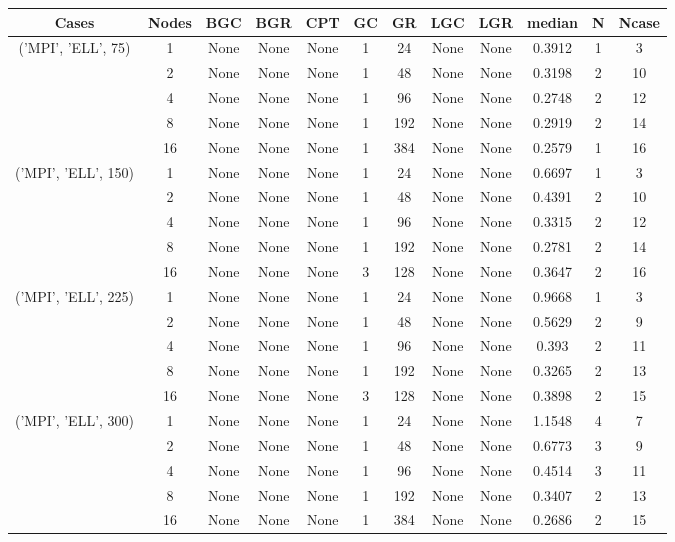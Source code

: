 \begin{tabular}{cccccccccccc}
\hline
Cases & Nodes& BGC& BGR& CPT& GC& GR& LGC& LGR& median & N & Ncase \\
\hline
\multirow{5}{*}{('MPI', 'ELL', 75)}& 1& None& None& None& 1& 24& None& None& 0.3912& 1& 3\\
& 2& None& None& None& 1& 48& None& None& 0.3198& 2& 10\\
& 4& None& None& None& 1& 96& None& None& 0.2748& 2& 12\\
& 8& None& None& None& 1& 192& None& None& 0.2919& 2& 14\\
& 16& None& None& None& 1& 384& None& None& 0.2579& 1& 16\\
\hline
\multirow{5}{*}{('MPI', 'ELL', 150)}& 1& None& None& None& 1& 24& None& None& 0.6697& 1& 3\\
& 2& None& None& None& 1& 48& None& None& 0.4391& 2& 10\\
& 4& None& None& None& 1& 96& None& None& 0.3315& 2& 12\\
& 8& None& None& None& 1& 192& None& None& 0.2781& 2& 14\\
& 16& None& None& None& 3& 128& None& None& 0.3647& 2& 16\\
\hline
\multirow{5}{*}{('MPI', 'ELL', 225)}& 1& None& None& None& 1& 24& None& None& 0.9668& 1& 3\\
& 2& None& None& None& 1& 48& None& None& 0.5629& 2& 9\\
& 4& None& None& None& 1& 96& None& None& 0.393& 2& 11\\
& 8& None& None& None& 1& 192& None& None& 0.3265& 2& 13\\
& 16& None& None& None& 3& 128& None& None& 0.3898& 2& 15\\
\hline
\multirow{5}{*}{('MPI', 'ELL', 300)}& 1& None& None& None& 1& 24& None& None& 1.1548& 4& 7\\
& 2& None& None& None& 1& 48& None& None& 0.6773& 3& 9\\
& 4& None& None& None& 1& 96& None& None& 0.4514& 3& 11\\
& 8& None& None& None& 1& 192& None& None& 0.3407& 2& 13\\
& 16& None& None& None& 1& 384& None& None& 0.2686& 2& 15\\
\hline
\end{tabular}
